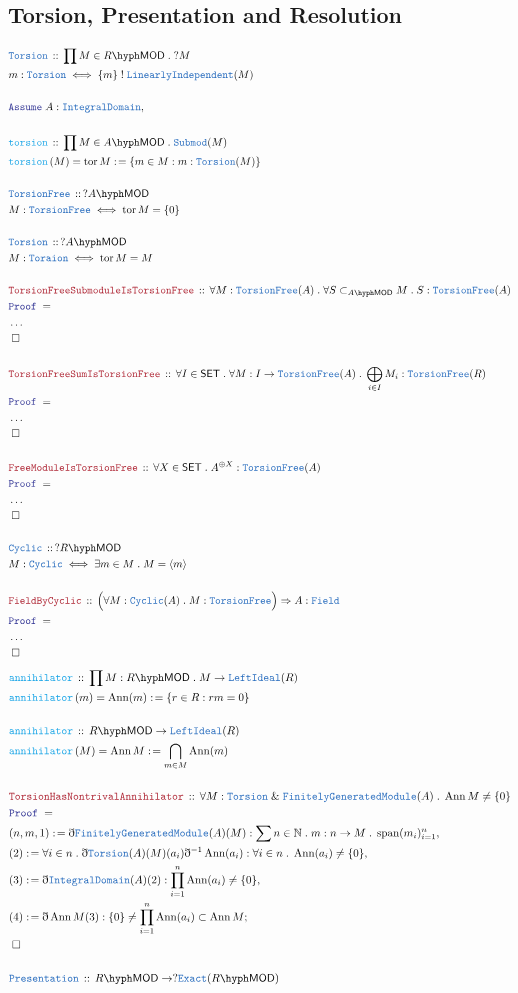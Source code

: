 \documentclass[12pt]{scrartcl}
\newcommand{\TYPE}[1]{\textcolor{NavyBlue}{\mathtt{#1}}}
\newcommand{\FUNC}[1]{\textcolor{Cerulean}{\mathtt{#1}}}
\newcommand{\LOGIC}[1]{\textcolor{Blue}{\mathtt{#1}}}
\newcommand{\THM}[1]{\textcolor{Maroon}{\mathtt{#1}}}
\renewcommand{\.}{\; . \;}
\newcommand{\de}{: \kern 0.1pc =}
\newcommand{\IsNot}{\; ! \;}
\newcommand{\Act}[1]{\left(#1\right)}
\newcommand{\Theorem}[2]{& \THM{#1} \, :: \, #2 \\ & \Proof = \\ }
\newcommand{\DeclareType}[2]{& \TYPE{#1} \, :: \, #2 \\}
\newcommand{\DefineType}[3]{& #1 : \TYPE{#2} \iff #3 \\}
\newcommand{\DeclareFunc}[2]{& \FUNC{#1} \, :: \, #2 \\}
\newcommand{\DefineNamedFunc}[4]{&  \FUNC{#1}\Act{#2} = #3 \de #4 \\}
\newcommand{\Page}[1]{ \begin{align*} #1 \end{align*}   }
\newcommand{ \bd }{ \ByDef }
\newcommand{\NoProof}{ & \ldots \\ \EndProof}
\renewcommand{\And}{\; \& \;}
\newcommand{\Nat}{\mathbb{N} }
\newcommand{\Say}[3]{& #1 \de #2 : #3, \\}
\newcommand{\Conclude}[3]{& #1 \de #2 : #3; \\}
\newcommand{\Assume}[2]{& \LOGIC{Assume} \; #1 : #2, \\}
\newcommand{\QED}{\; \square}
\newcommand{\EndProof}{& \QED \\}
\newcommand{\ByDef}{\eth}
\newcommand{\Proof}{\LOGIC{Proof} \; }
\newcommand{\SET}{\mathsf{SET}}
\DeclareMathOperator{\tor}{tor}
\newcommand{\submod}[1]{\subset_{\LMOD{#1}}}
\newcommand{\FGM}{\TYPE{FinitelyGeneratedModule}}
\newcommand{\LI}{\TYPE{LinearlyIndependent}}
\DeclareMathOperator{\Span}{span}
\DeclareMathOperator{\Ann}{Ann}
\newcommand{\LMOD}[1]{#1\hyph\mathsf{MOD}}
\newcommand{\ID}{\TYPE{IntegralDomain}}
\begin{document}
\subsection{Torsion, Presentation and Resolution}
\Page{
	\DeclareType{Torsion}{\prod M \in \LMOD{R} \. ?M}
	\DefineType{m}{Torsion}{\{m\} \IsNot \LI(M)}
	\\
	\Assume{A}{\ID}
	\\
	\DeclareFunc{torsion}{\prod M \in \LMOD{A} \. \TYPE{Submod}(M)}
	\DefineNamedFunc{torsion}{M}{\tor M}{ \{ m \in M : m : \TYPE{Torsion}(M) \} }
	\\
	\DeclareType{TorsionFree}{?\LMOD{A} }
	\DefineType{M}{TorsionFree}{\tor M = \{0\}}
	\\
	\DeclareType{Torsion}{?\LMOD{A}}
	\DefineType{M}{Toraion}{ \tor M = M }
	\\
	\Theorem{TorsionFreeSubmoduleIsTorsionFree}
	{
		\forall M : \TYPE{TorsionFree}(A) \. \forall S \submod{A} M \. S : \TYPE{TorsionFree}(A) 
	}
	\NoProof
	\\
	\Theorem{TorsionFreeSumIsTorsionFree}
	{
		\forall I \in \SET \. \forall M : I \to \TYPE{TorsionFree}(A) \. 
		\bigoplus_{i \in I} M_i : \TYPE{TorsionFree}(R)
	}
	\NoProof
	\\
	\Theorem{FreeModuleIsTorsionFree}
	{ \forall X \in \SET \. A^{\oplus X} : \TYPE{TorsionFree}(A)    }
	\NoProof
	\\
	\DeclareType{Cyclic}{?\LMOD{R}}
	\DefineType{M}{Cyclic}{\exists m \in M \. M = \langle m \rangle}
	\\
	\Theorem{FieldByCyclic}{\Big(\forall M : \TYPE{Cyclic}(A) \.  M : \TYPE{TorsionFree} \Big) \Rightarrow A : \TYPE{Field}}
	\NoProof
}\Page{
	\DeclareFunc{annihilator}{\prod M : \LMOD{R} \. M \to \TYPE{LeftIdeal}(R)}
	\DefineNamedFunc{annihilator}{m}{\Ann(m)}{\{ r \in R : rm = 0   \} }
	\\
	\DeclareFunc{annihilator}{\LMOD{R} \to \TYPE{LeftIdeal}(R)}
	\DefineNamedFunc{annihilator}{M}{\Ann M}{\bigcap_{m \in M} \Ann(m) }
	\\
	\Theorem{TorsionHasNontrivalAnnihilator}
	{ \forall M : \TYPE{Torsion} \And \FGM(A) \. \Ann M \neq \{0\}   }
	\Say{(n,m,1)}{\bd \FGM(A)(M)}{\sum n \in \Nat \. m : n \to M \. \Span(m_i)_{i=1}^n}
	\Say{(2)}{\forall i \in n \. \bd \TYPE{Torsion}(A)(M)(a_i)\bd^{-1}\Ann(a_i)}
	{  \forall i \in n \. \Ann(a_i) \neq \{ 0 \}   }
	\Say{(3)}{\bd \ID(A)(2)}{\prod_{i=1}^n \Ann(a_i) \neq \{0\} }
	\Conclude{(4)}{\bd \Ann M(3)}{ \{0\} \neq \prod_{i=1}^n \Ann(a_i)  \subset \Ann M }
	\EndProof
	\\
	\DeclareType{Presentation}{ \LMOD{R} \to ?\TYPE{Exact}(\LMOD{R})}
}
\end{document}
